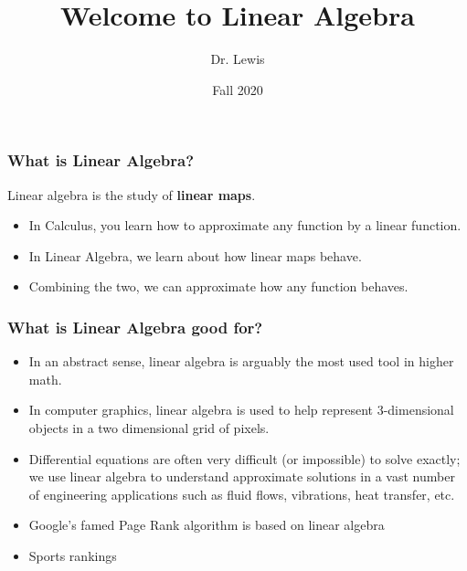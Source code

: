 \documentclass[aspectration=1610]{beamer}
\title{Welcome to Linear Algebra}
\author{Dr. Lewis}
\date{Fall 2020}
\begin{document}
\begin{frame}
\titlepage
\end{frame}

%  
 



\begin{frame} \frametitle{What is Linear Algebra? }
Linear algebra is the study of {\bf linear maps}.
\begin{itemize}
\item In Calculus, you learn how to approximate any function by a linear function.
\item In Linear Algebra, we learn about how linear maps behave.
\item Combining the two, we can approximate how any function behaves.
\end{itemize}
\end{frame}

\begin{frame} \frametitle{What is Linear Algebra good for?}
\begin{itemize}
\item In an abstract sense, linear algebra is arguably the most used tool in higher math.
\item In computer graphics, linear algebra is used to help represent 3-dimensional objects in a two dimensional grid of pixels.
\item Differential equations are often very difficult (or impossible) to solve exactly; we use linear algebra to understand approximate solutions in a vast number of engineering applications such as fluid flows, vibrations, heat transfer, etc.
\item Google's famed Page Rank algorithm is based on linear algebra
\item Sports rankings 
\end{itemize}
\end{frame}
\end{document}
